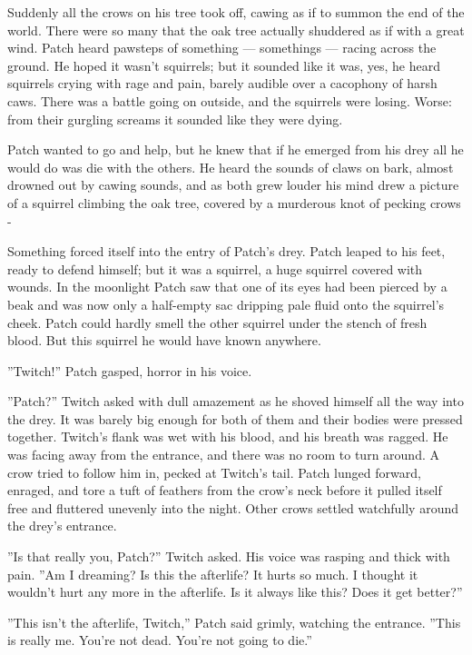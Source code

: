 \documentclass[12pt]{book}
\begin{document}
Suddenly all the crows on his tree took off, cawing as if to summon the end of the world. There were so many that the oak tree actually shuddered as if with a great wind. Patch heard pawsteps of something ---
somethings ---
racing across the ground. He hoped it wasn't squirrels; but it sounded like it was, yes, he heard squirrels crying with rage and pain, barely audible over a cacophony of harsh caws. There was a battle going on outside, and the squirrels were losing. Worse: from their gurgling screams it sounded like they were dying.

Patch wanted to go and help, but he knew that if he emerged from his drey all he would do was die with the others. He heard the sounds of claws on bark, almost drowned out by cawing sounds, and as both grew louder his mind drew a picture of a squirrel climbing the oak tree, covered by a murderous knot of pecking crows -

Something forced itself into the entry of Patch's drey. Patch leaped to his feet, ready to defend himself; but it was a squirrel, a huge squirrel covered with wounds. In the moonlight Patch saw that one of its eyes had been pierced by a beak and was now only a half-empty sac dripping pale fluid onto the squirrel's cheek. Patch could hardly smell the other squirrel under the stench of fresh blood. But this squirrel he would have known anywhere.

''Twitch!'' Patch gasped, horror in his voice.

''Patch?'' Twitch asked with dull amazement as he shoved himself all the way into the drey. It was barely big enough for both of them and their bodies were pressed together. Twitch's flank was wet with his blood, and his breath was ragged. He was facing away from the entrance, and there was no room to turn around. A crow tried to follow him in, pecked at Twitch's tail. Patch lunged forward, enraged, and tore a tuft of feathers from the crow's neck before it pulled itself free and fluttered unevenly into the night. Other crows settled watchfully around the drey's entrance.

''Is that really you, Patch?'' Twitch asked. His voice was rasping and thick with pain. ''Am I dreaming? Is this the afterlife? It hurts so much. I thought it wouldn't hurt any more in the afterlife. Is it always like this? Does it get better?''

''This isn't the afterlife, Twitch,'' Patch said grimly, watching the entrance. ''This is really me. You're not dead. You're not going to die.''
\end{document}
